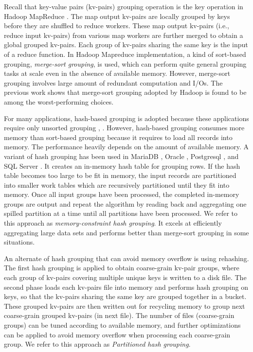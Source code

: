 Recall that key-value pairs (kv-pairs) grouping operation is the key operation in Hadoop MapReduce \cite{dean2008mapreduce}. The map output kv-pairs are locally grouped by keys before they are shuffled to reduce workers. These map output kv-pairs (i.e., reduce input kv-pairs) from various map workers are further merged to obtain a global grouped kv-pairs. Each group of kv-pairs sharing the same key is the input of a reduce function. In Hadoop Mapreduce implementation, a kind of sort-based grouping, \emph{merge-sort grouping}, is used, which can perform quite general grouping tasks at scale even in the absence of available memory. However, merge-sort grouping involves large amount of redundant computation and I/Os. The previous work \cite{shvachko2010hadoop,yu2009distributed,Li2011A} shows that merge-sort grouping adopted by Hadoop is found to be among the worst-performing choices.

For many applications, hash-based grouping is adopted because these applications require only unsorted grouping \cite{lin2011tenzing}, \cite{yu2009distributed}. However, hash-based grouping consumes more memory than sort-based grouping because it requires to load all records into memory. The performance heavily depends on the amount of available memory. A variant of hash grouping has been used in MariaDB \cite{bartholomew2012mariadb}, Oracle \cite{stephens2005oracle}, Postgresql \cite{momjian2001postgresql}, and SQL Server \cite{agrawal2005database}. It creates an in-memory hash table for grouping rows. If the hash table becomes too large to be fit in memory, the input records are partitioned into smaller work tables which are recursively partitioned until they fit into memory. Once all input groups have been processed, the completed in-memory groups are output and repeat the algorithm by reading back and aggregating one spilled partition at a time until all partitions have been processed. We refer to this approach as \emph{memory-constraint hash grouping}. It excels at efficiently aggregating large data sets and performs better than merge-sort grouping in some situations.

An alternate of hash grouping that can avoid memory overflow is using rehashing. The first hash grouping is applied to obtain coarse-grain kv-pair groups, where each group of kv-pairs covering multiple unique keys is written to a disk file. The second phase loads each kv-pairs file into memory and performs hash grouping on keys, so that the kv-pairs sharing the same key are grouped together in a bucket. These grouped kv-pairs are then written out for recycling memory to group next coarse-grain grouped kv-pairs (in next file). The number of files (coarse-grain groups) can be tuned according to available memory, and further optimizations can be applied to avoid memory overflow when processing each coarse-grain group. We refer to this approach as \emph{Partitioned hash grouping}.

